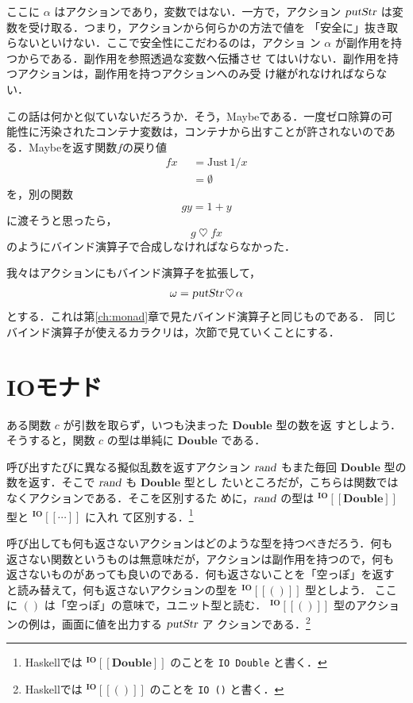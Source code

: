 \documentclass[a5paper,twoside,fleqn,draft]{jsbook}
\def\[{[\![}
\def\]{]\!]}
\newcommand{\programminglanguage}[1]{\textsf{#1}}
\newcommand{\haskell}{\programminglanguage{Haskell}}
\newcommand{\code}[1]{\texttt{#1}}
\newcommand{\mKeyword}[1]{\mathsf{#1}}
\newcommand{\mOtherwiseKeyword}{\mKeyword{otherwise}}
\DeclareMathOperator{\mOtherwise}{\mOtherwiseKeyword}
\newcommand{\mNothing}{\emptyset}
\newcommand{\mAction}[1]{\textsl{#1}}
\DeclareMathOperator{\mPutStr}{\mAction{putStr}}
\DeclareMathOperator{\mRand}{\mAction{rand}}
\DeclareMathOperator{\mBind}{\heartsuit}
\newcommand{\mType}[1]{\mathbf{#1}} %
\newcommand{\mDoubleType}{\mType{Double}}
\newcommand{\mUnitType}{\mType{()}}
\newcommand{\mTypeAssemble}[2]{{}^\mType{#1}\[\mType{#2}\]}
\newcommand{\mIOType}[1]{\mTypeAssemble{IO}{#1}}
\newcommand{\mIODoubleType}{\mIOType{\mDoubleType}}
\newcommand{\mIOUnitType}{\mIOType{\mUnitType}}
\newcommand{\mValueConstructor}[1]{\mathrm{#1}}
\newcommand{\mValueWith}[2]{\mValueConstructor{#1}\,#2}
\newcommand{\mJustWith}[1]{\mValueWith{Just}{#1}}
\newcommand{\mGuard}[1]{\mathop{\mid_{#1}}}
\begin{document}
ここに $\alpha$ はアクションであり，変数ではない．一方で，アクション
$\mPutStr$ は変数を受け取る．つまり，アクションから何らかの方法で値を
「安全に」抜き取らないといけない．ここで安全性にこだわるのは，アクショ
ン $\alpha$ が副作用を持つからである．副作用を参照透過な変数へ伝播させ
てはいけない．副作用を持つアクションは，副作用を持つアクションへのみ受
け継がれなければならない．

この話は何かと似ていないだろうか．そう，Maybeである．一度ゼロ除算の可
能性に汚染されたコンテナ変数は，コンテナから出すことが許されないのであ
る．Maybeを返す関数$f$の戻り値
\begin{equation}
  \begin{aligned}
    fx&\mGuard{x\neq0}=\mJustWith{1/x}\\
    &\mGuard{\mOtherwise}=\mNothing
  \end{aligned}
\end{equation}
を，別の関数
\begin{equation}
  gy=1+y
\end{equation}
に渡そうと思ったら，
\begin{equation}
  g\mBind fx
\end{equation}
のようにバインド演算子で合成しなければならなかった．

我々はアクションにもバインド演算子を拡張して，
\begin{equation}
  \omega=\mPutStr\mBind\alpha
\end{equation}
とする．これは第\ref{ch:monad}章で見たバインド演算子と同じものである．
同じバインド演算子が使えるカラクリは，次節で見ていくことにする．

\section{IOモナド}

ある関数 $c$ が引数を取らず，いつも決まった $\mDoubleType$ 型の数を返
すとしよう．そうすると，関数 $c$ の型は単純に $\mDoubleType$ である．

呼び出すたびに異なる擬似乱数を返すアクション $\mRand$ もまた毎回
$\mDoubleType$ 型の数を返す．そこで $\mRand$ も $\mDoubleType$ 型とし
たいところだが，こちらは関数ではなくアクションである．そこを区別するた
めに，$\mRand$ の型は $\mIODoubleType$ 型と $\mIOType{\dotsb}$ に入れ
て区別する．\footnote{\haskell では $\mIODoubleType$ のことを \code{IO
Double} と書く．}

呼び出しても何も返さないアクションはどのような型を持つべきだろう．何も
返さない関数というものは無意味だが，アクションは副作用を持つので，何も
返さないものがあっても良いのである．何も返さないことを「空っぽ」を返す
と読み替えて，何も返さないアクションの型を $\mIOUnitType$ 型としよう．
ここに $\mUnitType$ は「空っぽ」の意味で，ユニット型と読む．
$\mIOUnitType$ 型のアクションの例は，画面に値を出力する $\mPutStr$ ア
クションである．\footnote{\haskell では $\mIOUnitType$ のことを
  \code{IO ()} と書く．}
\end{document}
